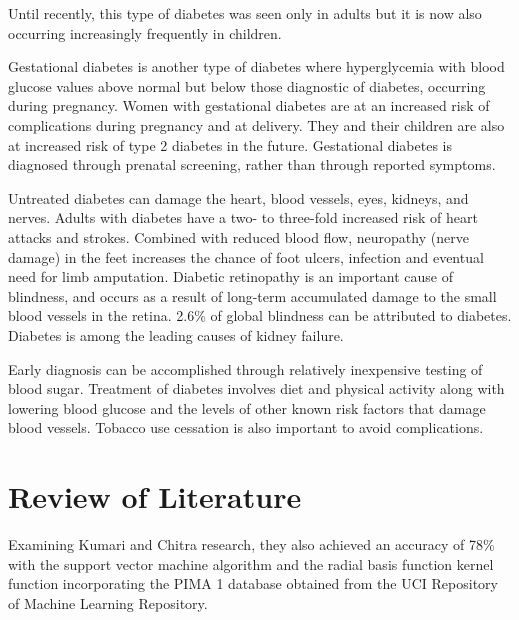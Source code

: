 \documentclass[12pt]{article}
\begin{document}
Until recently, this type of diabetes was seen only in adults but it is now also occurring increasingly frequently in children.

Gestational diabetes is another type of diabetes where hyperglycemia with blood glucose values above normal but below those diagnostic of diabetes, occurring during pregnancy. Women with gestational diabetes are at an increased risk of complications during pregnancy and at delivery. They and their children are also at increased risk of type 2 diabetes in the future. Gestational diabetes is diagnosed through prenatal screening, rather than through reported symptoms.

Untreated diabetes can damage the heart, blood vessels, eyes, kidneys, and nerves. Adults with diabetes have a two- to three-fold increased risk of heart attacks and strokes. Combined with reduced blood flow, neuropathy (nerve damage) in the feet increases the chance of foot ulcers, infection and eventual need for limb amputation. Diabetic retinopathy is an important cause of blindness, and occurs as a result of long-term accumulated damage to the small blood vessels in the retina. 2.6\% of global blindness can be attributed to diabetes. Diabetes is among the leading causes of kidney failure.

Early diagnosis can be accomplished through relatively inexpensive testing of blood sugar. Treatment of diabetes involves diet and physical activity along with lowering blood glucose and the levels of other known risk factors that damage blood vessels. Tobacco use cessation is also important to avoid complications. \cite{alberti_zimmet_2004}\cite{internationaldiabetesfederation}

\newpage
\section{Review of Literature}

Examining Kumari and Chitra \cite{kumarandchitra} research, they also achieved an accuracy of 78\% with the support vector machine algorithm and the radial basis function kernel function incorporating the PIMA 1 database obtained from the UCI Repository of Machine Learning Repository. 
\end{document}
